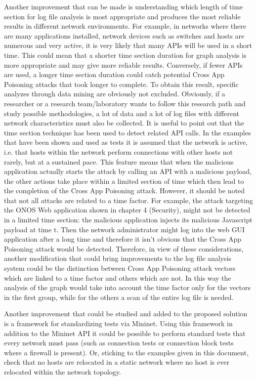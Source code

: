 \documentclass[a4paper,10pt]{memoir}
\begin{document}
{Another improvement that can be made is understanding which length of time section for log file analysis is most appropriate and produces the most reliable results in different network environments. For example, in networks where there are many applications installed, network devices such as switches and hosts are numerous and very active, it is very likely that many APIs will be used in a short time. This could mean that a shorter time section duration for graph analysis is more appropriate and may give more reliable results. Conversely, if fewer APIs are used, a longer time section duration could catch potential Cross App Poisoning attacks that took longer to complete. To obtain this result, specific analyzes through data mining are obviously not excluded. Obviously, if a researcher or a research team/laboratory wants to follow this research path and study possible methodologies, a lot of data and a lot of log files with different network characteristics must also be collected. It is useful to point out that the time section technique has been used to detect related API calls. In the examples that have been shown and used as tests it is assumed that the network is active, i.e. that hosts within the network perform connections with other hosts not rarely, but at a sustained pace. This feature means that when the malicious application actually starts the attack by calling an API with a malicious payload, the other actions take place within a limited section of time which then lead to the completion of the Cross App Poisoning attack. However, it should be noted that not all attacks are related to a time factor. For example, the attack targeting the ONOS Web application shown in chapter 4 (Security), might not be detected in a limited time section: the malicious application injects its malicious Javascript payload at time t. Then the network administrator might log into the web GUI application after a long time and therefore it isn't obvious that the Cross App Poisoning attack would be detected. Therefore, in view of these considerations, another modification that could bring improvements to the log file analysis system could be the distinction between Cross App Poisoning attack vectors which are linked to a time factor and others which are not. In this way the analysis of the graph would take into account the time factor only for the vectors in the first group, while for the others a scan of the entire log file is needed.
\medskip

Another improvement that could be studied and added to the proposed solution is a framework for standardizing tests via Mininet. Using this framework in addition to the Mininet API it could be possible to perform standard tests that every network must pass (such as connection tests or connection block tests where a firewall is present). Or, sticking to the examples given in this document, check that no hosts are relocated in a static network where no host is ever relocated within the network topology.
\medskip

}
\end{document}
